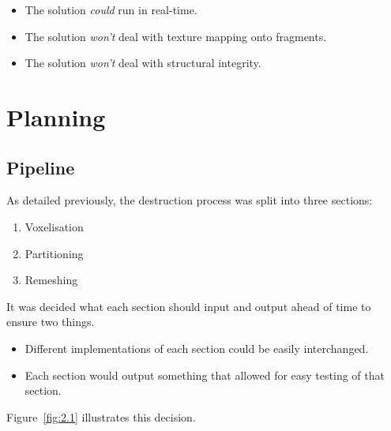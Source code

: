 \begin{itemize}
\item{The solution \emph{could} run in real-time.}
\end{itemize}

\begin{itemize}
\item{The solution \emph{won't} deal with texture mapping onto fragments.}
\item{The solution \emph{won't} deal with structural integrity.}
\end{itemize}

\section{Planning}

\subsection{Pipeline}

As detailed previously, the destruction process was split into three sections:

\begin{enumerate}
\item{Voxelisation}
\item{Partitioning}
\item{Remeshing}
\end{enumerate}

It was decided what each section should input and output ahead of time to ensure two things.

\begin{itemize}
\item{Different implementations of each section could be easily interchanged.}
\item{Each section would output something that allowed for easy testing of that section.}
\end{itemize}

Figure~\ref{fig:2.1} illustrates this decision.

